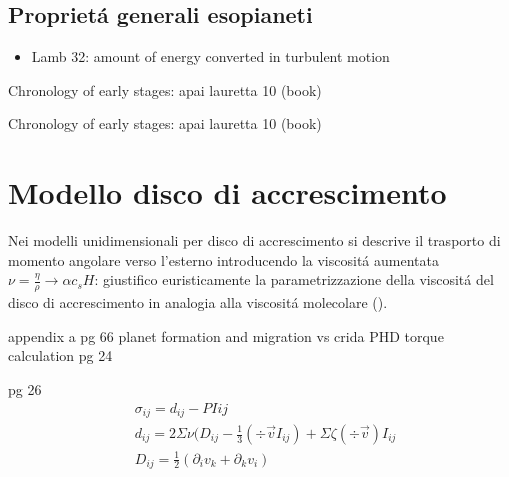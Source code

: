 \section{Propriet\'a generali esopianeti}


\begin{workout}
	\begin{itemize}
		\item Lamb 32: amount of energy converted in turbulent motion
	\end{itemize}
\end{workout}

\begin{workout}
	Chronology of  early stages: apai lauretta 10 (book)
\end{workout}

\begin{workout}
	Chronology of  early stages: apai lauretta 10 (book)
\end{workout}

{\let\clearpage\relax\let\cleardoublepage\relax
\chapter{Modello disco di accrescimento}
}

Nei modelli unidimensionali per disco di accrescimento si descrive il trasporto di momento angolare verso l'esterno introducendo la viscosit\'a aumentata $\nu=\frac{\eta}{\rho}\to\alpha c_s H$: giustifico euristicamente la parametrizzazione della viscosit\'a del disco di accrescimento in analogia alla viscosit\'a molecolare (\cite{bouvier2002theory}).

\begin{workout}
	appendix a pg 66 planet formation and migration vs crida PHD torque calculation pg 24
\end{workout}
\begin{workout}
	pg 26
	\begin{align}
	&\sigma_{ij}=d_{ij}-PI{ij}\\
	&d_{ij}=2\Sigma\nu(D_{ij}-\frac{1}{3}(\div{\vec{v}}I_{ij})+\Sigma\zeta(\div{\vec{v}})I_{ij}\\
	&D_{ij}=\frac{1}{2}(\partial_iv_k+\partial_kv_i)
	\end{align}
\end{workout}

